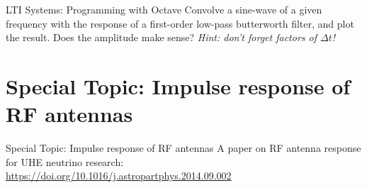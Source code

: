 \documentclass{beamer}
\begin{document}
\begin{frame}[fragile]{LTI Systems: Programming with Octave}
\small
Convolve a sine-wave of a given frequency with the response of a first-order low-pass butterworth filter, and plot the result.  Does the amplitude make sense? \textit{Hint: don't forget factors of $\Delta t$!}
\end{frame}

\section{Special Topic: Impulse response of RF antennas}

\begin{frame}{Special Topic: Impulse response of RF antennas}
\small
A paper on RF antenna response for UHE neutrino research: \\ \url{https://doi.org/10.1016/j.astropartphys.2014.09.002}
\end{frame}
\end{document}
